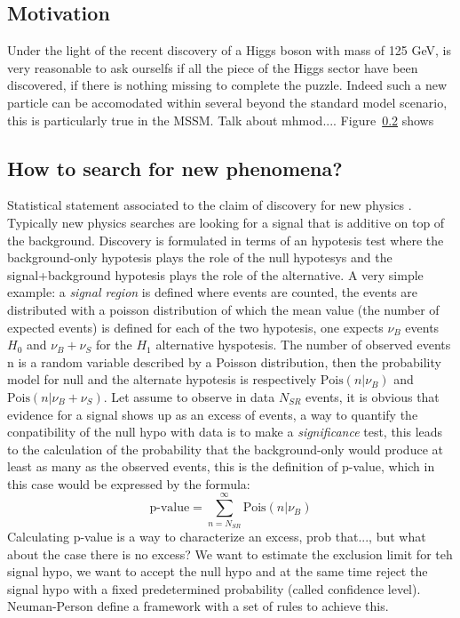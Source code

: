 \subsection{Motivation}
Under the light of the recent discovery of a Higgs boson with mass of 125 GeV, is very reasonable
to ask ourselfs if all the piece of the Higgs sector have been discovered, if there is nothing missing
to complete the puzzle. Indeed such a new particle can be accomodated within several beyond the 
standard model scenario, this is particularly true in the MSSM. 
Talk about mhmod....
Figure~\ref{} shows 

\subsection{How to search for new phenomena?} 
Statistical statement associated to the claim of discovery for new physics \cite{Cramer_LHC}. Typically new physics searches are looking for a signal 
that is additive on top of the background. Discovery is formulated in terms of an hypotesis test where the background-only hypotesis
plays the role of the null hypotesys and the signal+background hypotesis plays the role of the alternative. A very simple example:
a \emph{signal region} is defined where events are counted, the events are distributed with a poisson distribution 
of which the mean value (the number of expected events) is defined for each of the two hypotesis, one expects $\nu_{B}$ events 
$H_{0}$ and $\nu_{B} + \nu_{S}$ for the $H_{1}$ alternative hyspotesis. The number of observed events n is a random
variable described by a Poisson distribution, then the probability model for null and the alternate hypotesis is respectively 
$\text{Pois}(n|\nu_{B})$ and $\text{Pois}(n|\nu_{B} + \nu_{S})$.
Let assume to observe in data $N_{SR}$ events, it is obvious that evidence for a signal shows up as an excess of 
events, a way to quantify the conpatibility of the null hypo with data
is to make a \emph{significance} test, this leads to the calculation of the probability that the background-only would produce at least as many
as the observed events, this is the definition of p-value, which in this case would be expressed by the formula:
$$
\text{p-value} = \sum_{n=N_{SR}}^{\infty} \text{Pois}(n|\nu_{B})
$$
Calculating  p-value is a way to characterize an excess, prob that..., but what about the case there is no excess?
We want to estimate the exclusion limit for teh signal hypo, we want to accept the null hypo and at the same time reject 
the signal hypo with a fixed predetermined probability (called confidence level). Neuman-Person define a framework with a
set of rules to achieve this.

